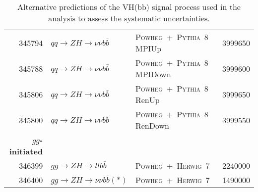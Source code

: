 \begin{table}[ht!b]
{\begin{tabular}{rllr}
      345794 & $qq\to ZH \to \nu\nu b\bar{b}$  & \textsc{Powheg}~+~\textsc{Pythia}~8  MPIUp & 3999650 \\
      345788 & $qq\to ZH \to \nu\nu b\bar{b}$  & \textsc{Powheg}~+~\textsc{Pythia}~8  MPIDown & 3999600 \\
      345806 & $qq\to ZH \to \nu\nu b\bar{b}$  & \textsc{Powheg}~+~\textsc{Pythia}~8  RenUp & 3999650 \\
      345800 & $qq\to ZH \to \nu\nu b\bar{b}$  & \textsc{Powheg}~+~\textsc{Pythia}~8  RenDown & 3999550 \\
      {\bfseries $gg$-initiated} & & & \\
      346399 & $gg\to ZH \to ll b\bar{b}$    & \textsc{Powheg}~+~\textsc{Herwig}~7   & 2240000 \\
      346400 & $gg\to ZH \to \nu\nu b\bar{b}(*) $  &  \textsc{Powheg}~+~\textsc{Herwig}~7   &  1490000 \\
      \bottomrule
    \end{tabular}
  }
  \caption{Alternative predictions of the VH(bb) signal process used in the
    analysis to assess the systematic uncertainties.}
  \label{tab:VHSMsignals-alt}
\end{table}